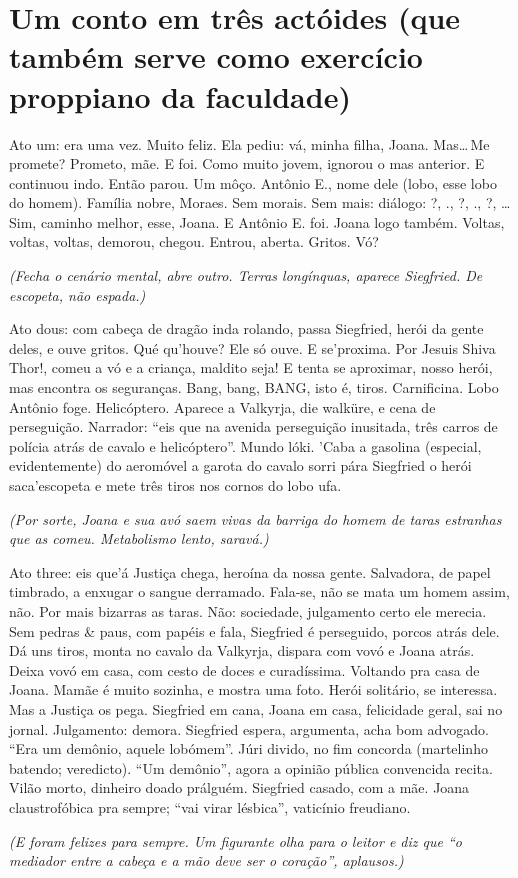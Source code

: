 \chapter[Um conto em três actóides]{Um conto em três actóides (que também serve como exercício proppiano da faculdade)}

Ato um: era uma vez. Muito feliz. Ela pediu: vá, minha filha, Joana. Mas\ldots\,Me promete? Prometo, mãe. E foi. Como muito jovem, ignorou o mas anterior. E continuou indo. Então parou. Um môço. Antônio E., nome dele (lobo, esse lobo do homem). Família nobre, Moraes. Sem morais. Sem mais: diálogo: ?, ., ?, ., ?, \ldots\,Sim, caminho melhor, esse, Joana. E Antônio E. foi. Joana logo também. Voltas, voltas, voltas, demorou, chegou. Entrou, aberta. Gritos. Vó?

\begin{center}
\emph{(Fecha o cenário mental, abre outro. Terras longínquas, aparece Siegfried. De escopeta, não espada.)}
\end{center}

Ato dous: com cabeça de dragão inda rolando, passa Siegfried, herói da gente deles, e ouve gritos. Qué qu'houve? Ele só ouve. E se'proxima. Por Jesuis Shiva Thor!, comeu a vó e a criança, maldito seja! E tenta se aproximar, nosso herói, mas encontra os seguranças. Bang, bang, BANG, isto é, tiros. Carnificina. Lobo Antônio foge. Helicóptero. Aparece a Valkyrja, die walküre, e cena de perseguição. Narrador: ``eis que na avenida perseguição inusitada, três carros de polícia atrás de cavalo e helicóptero''. Mundo lóki. 'Caba a gasolina (especial, evidentemente) do aeromóvel a garota do cavalo sorri pára Siegfried o herói saca'escopeta e mete três tiros nos cornos do lobo ufa.

\begin{center}
\emph{(Por sorte, Joana e sua avó saem vivas da barriga do homem de taras estranhas que as comeu. Metabolismo lento, saravá.)}
\end{center}

Ato \foreignlanguage{english}{three}: eis que'á Justiça chega, heroína da nossa gente. Salvadora, de papel timbrado, a enxugar o sangue derramado. Fala-se, não se mata um homem assim, não. Por mais bizarras as taras. Não: sociedade, julgamento certo ele merecia. Sem pedras \& paus, com papéis e fala, Siegfried é perseguido, porcos atrás dele. Dá uns tiros, monta no cavalo da Valkyrja, dispara com vovó e Joana atrás. Deixa vovó em casa, com cesto de doces e curadíssima. Voltando pra casa de Joana. Mamãe é muito sozinha, e mostra uma foto. Herói solitário, se interessa. Mas a Justiça os pega. Siegfried em cana, Joana em casa, felicidade geral, sai no jornal. Julgamento: demora. Siegfried espera, argumenta, acha bom advogado. ``Era um demônio, aquele lobómem''. Júri divido, no fim concorda (martelinho batendo; veredicto). ``Um demônio'', agora a opinião pública convencida recita. Vilão morto, dinheiro doado prálguém. Siegfried casado, com a mãe. Joana claustrofóbica pra sempre; ``vai virar lésbica'', vaticínio freudiano.

\begin{center}
\emph{(E foram felizes para sempre. Um figurante olha para o leitor e diz que ``o mediador entre a cabeça e a mão deve ser o coração'', aplausos.)}
\end{center}
